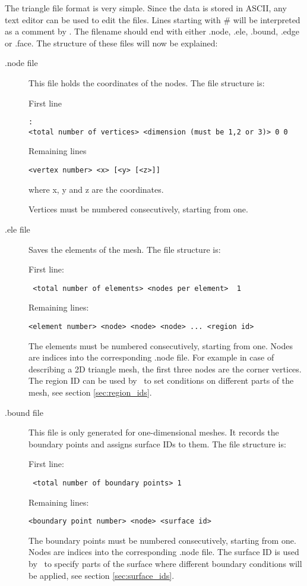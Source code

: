 The triangle file format is very simple. Since the data is stored in ASCII,
any text editor can be used to edit the files.  Lines starting with \# will
be interpreted as a comment by \fluidity.  The filename should end with
either .node, .ele, .bound, .edge or .face.  The structure of these files
will now be explained:

\begin{description}
\item[.node file]
This file holds the coordinates of the nodes. The file structure is:

First line
\begin{lstlisting}:
<total number of vertices> <dimension (must be 1,2 or 3)> 0 0
\end{lstlisting}
Remaining lines
\begin{lstlisting}
<vertex number> <x> [<y> [<z>]]
\end{lstlisting}
where x, y and z are the coordinates.

Vertices must be numbered consecutively, starting from one.

\item[.ele file] Saves the elements of the mesh. The file structure is:

First line:
\begin{lstlisting}
 <total number of elements> <nodes per element>  1
\end{lstlisting}
Remaining lines:
\begin{lstlisting}
<element number> <node> <node> <node> ... <region id>
\end{lstlisting}
The elements must be numbered consecutively, starting from one. Nodes are
indices into the corresponding .node file. For example in case of describing
a 2D triangle mesh, the first three nodes are the corner vertices. The
region ID can be used by \fluidity\ to set conditions on different parts of
the mesh, see section \ref{sec:region_ids}.

\item[.bound file] This file is only generated for one-dimensional meshes.
  It records the boundary points and assigns surface IDs to them. The file
  structure is:

First line:
\begin{lstlisting}
 <total number of boundary points> 1
\end{lstlisting}
Remaining lines:
\begin{lstlisting}
<boundary point number> <node> <surface id>
\end{lstlisting}
The boundary points must be numbered consecutively, starting from one. Nodes
are indices into the corresponding .node file. The surface ID is used by
\fluidity\ to specify parts of the surface where different boundary
conditions will be applied, see section \ref{sec:surface_ids}.


\end{description}
